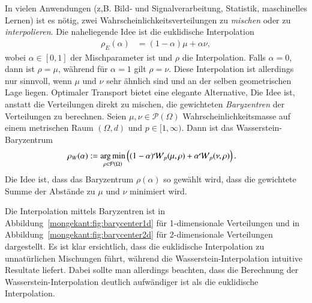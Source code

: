 In vielen Anwendungen
(z,B. Bild‑ und Signalverarbeitung, Statistik, maschinelles Lernen) ist es nötig,
zwei Wahrscheinlichkeitsverteilungen zu \emph{mischen}
oder zu \emph{interpolieren}.
Die naheliegende Idee ist die euklidische Interpolation
\begin{align}
\rho_E(\alpha)
&=
(1-\alpha) \mu + \alpha \nu
\label{mongekant:eq:euclidean_barycenter}
,
\end{align}
wobei $\alpha \in [0,1]$ der Mischparameter ist und $\rho$ die Interpolation.
Falls $\alpha=0$,
dann ist $\rho=\mu$,
während für $\alpha=1$ gilt $\rho=\nu$.
Diese Interpolation ist allerdings nur sinnvoll,
wenn $\mu$ und $\nu$ sehr ähnlich sind und an der selben geometrischen Lage liegen.
Optimaler Transport bietet eine elegante Alternative,
Die Idee ist,
anstatt die Verteilungen direkt zu mischen,
die gewichteten \emph{Baryzentren} der Verteilungen zu berechnen.
Seien $\mu, \nu \in \mathcal{P}(\Omega)$ Wahrscheinlichkeitsmasse
auf einem metrischen Raum $(\Omega, d)$
und $p \in [1, \infty)$.
Dann ist das Wasserstein-Baryzentrum
\begin{align}
\rho_W(\alpha)
&:=
\underset{\rho \in \mathcal{P}(\Omega)}{\mathrm{arg\,min}}\left(
(1-\alpha) \wasserstein(\mu, \rho)
+ \alpha \wasserstein(\nu, \rho)
\right)
\label{mongekant:eq:wasserstein_barycenter}
.
\end{align}
Die Idee ist,
dass das Baryzentrum $\rho(\alpha)$
so gewählt wird,
dass die gewichtete Summe der Abstände zu $\mu$ und $\nu$ minimiert wird.

Die Interpolation mittels Baryzentren
ist in Abbildung~\ref{mongekant:fig:barycenter1d} für 1-dimensionale Verteilungen
und in Abbildung~\ref{mongekant:fig:barycenter2d} für 2-dimensionale Verteilungen
dargestellt.
Es ist klar ersichtlich,
dass die euklidische Interpolation
zu unnatürlichen Mischungen führt,
während die Wasserstein-Interpolation
intuitive Resultate liefert.
Dabei sollte man allerdings beachten,
dass die Berechnung der Wasserstein-Interpolation
deutlich aufwändiger ist als die euklidische Interpolation.

